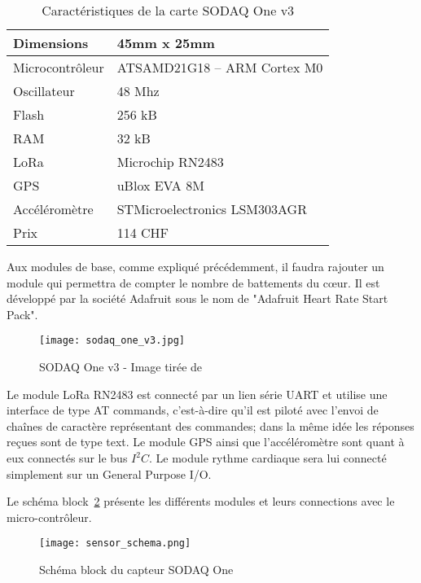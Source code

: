 \begin{table}[htb]
\caption[Caractéristiques de la carte SODAQ One v3]{Caractéristiques de la carte SODAQ One v3}
\label{tab:sodaq_one_cara}
\centering
\begin{tabular}{ l | l }
\toprule
Dimensions & 45mm x 25mm \\
\midrule
Microcontrôleur & ATSAMD21G18 – ARM Cortex M0 \\
\midrule
Oscillateur & 48 Mhz \\
\midrule
Flash & 256 kB \\
\midrule
RAM & 32 kB \\
\midrule
LoRa & Microchip RN2483 \\
\midrule
GPS & uBlox EVA 8M \\
\midrule
Accéléromètre & STMicroelectronics LSM303AGR \\
\midrule
Prix & 114 CHF\\
\bottomrule 
\end{tabular}
\end{table}

Aux modules de base, comme expliqué précédemment, il faudra rajouter un module qui permettra de compter le nombre de battements du cœur. Il est développé par la société Adafruit sous le nom de "Adafruit Heart Rate Start Pack".

\begin{figure}[htb]
\centering 
\texttt{[image: sodaq\_one\_v3.jpg]} 
\caption{SODAQ One v3 - Image tirée de }
\label{fig:sodaq_one_v3}
\end{figure}

Le module LoRa RN2483 est connecté par un lien série UART et utilise une interface de type AT commands, c'est-à-dire qu'il est piloté avec l'envoi de chaînes de caractère représentant des commandes; dans la même idée les réponses reçues sont de type text. Le module GPS ainsi que l'accéléromètre sont quant à eux connectés sur le bus $I^{2}C$. Le module rythme cardiaque sera lui connecté simplement sur un General Purpose I/O.

Le schéma block~\ref{fig:schema_block_sodaq} présente les différents modules et leurs connections avec le micro-contrôleur.

\begin{figure}[htb]
\centering 
\texttt{[image: sensor\_schema.png]} 
\caption{Schéma block du capteur SODAQ One}
\label{fig:schema_block_sodaq}
\end{figure}

